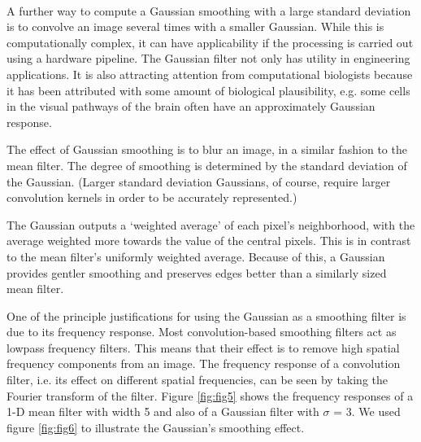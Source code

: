 \begin{figure}[h]
\begin{dBox}
\centering
  \mbox{
   }
   \caption{ \label{fig:fig4} }   
\end{dBox}   
\end{figure}


\bigskip
A further way to compute a Gaussian smoothing with a large 
standard deviation is to convolve an image several times with a 
smaller Gaussian. While this is computationally complex, it can have applicability if the processing 
is carried out using a hardware pipeline. 
\bigskip
The Gaussian filter not only has utility in engineering applications. It is also attracting attention 
from computational biologists because it has been attributed with some amount of biological 
plausibility, e.g. some cells in the visual pathways of the brain often have an approximately 
Gaussian response.

\bigskip
The effect of Gaussian smoothing is to blur an image, in a similar fashion to the mean filter. The 
degree of smoothing is determined by the standard deviation of the Gaussian. (Larger standard 
deviation Gaussians, of course, require larger convolution kernels in order to be accurately 
represented.) 

\bigskip
The Gaussian outputs a `weighted average' of each pixel's neighborhood, with the average 
weighted more towards the value of the central pixels. This is in contrast to the mean filter's 
uniformly weighted average. Because of this, a Gaussian provides gentler smoothing and 
preserves edges better than a similarly sized mean filter. 
\bigskip

One of the principle justifications for using 
the Gaussian as a smoothing filter is due 
to its frequency response. Most 
convolution-based smoothing filters act as 
lowpass frequency filters. This means that 
their effect is to remove high spatial 
frequency components from an image. The 
frequency response of a convolution 
filter, i.e. its effect on different spatial 
frequencies, can be seen by taking the 
Fourier transform of the filter. Figure \ref{fig:fig5}
shows the frequency responses of a 1-D mean filter with width 5 and also of a Gaussian filter 
with $\sigma$ = 3. We used figure \ref{fig:fig6} to illustrate the Gaussian's smoothing effect.

